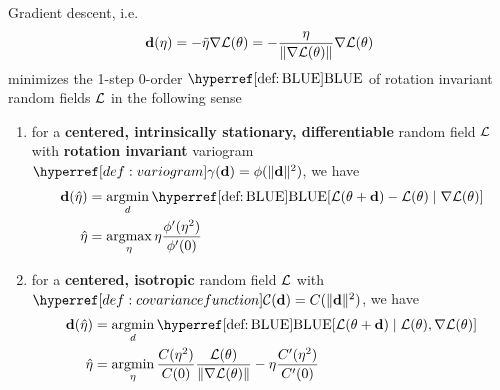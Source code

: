 
\begin{theorem}\label{thm: bayesian descent}
	Gradient descent, i.e. 
	\begin{equation*}
		\mathbf{d}(\eta) = - \tilde{\eta} \nabla\mathcal{L}(\theta)
		= - \frac{\eta}{\|\nabla\mathcal{L}(\theta)\|} \nabla\mathcal{L}(\theta)
	\end{equation*}
	minimizes the 1-step 0-order \(\BLUE\) of rotation invariant random fields
	\(\mathcal{L}\) in the following sense
	\begin{enumerate}
		\item for a \textbf{centered, intrinsically stationary, differentiable}
		random field \(\mathcal{L}\) with \textbf{rotation invariant} variogram
		\(\variogram(\step) = \phi(\|\step\|^2)\), we have
		\begin{align*}
			\step(\hat{\lr})
			&= \argmin_{d}
			\BLUE[\Loss(\param + \step) - \Loss(\param)\mid \grad\Loss(\param)]\\
			\hat{\lr}
			&= \argmax_{\lr} \lr\frac{\phi'(\lr^2)}{\phi'(0)}
		\end{align*}

		\item for a \textbf{centered, isotropic} random field \(\mathcal{L}\) with
		\(\C(\step)=C(\|\step\|^2)\), we have
		\begin{align*}
			\step(\hat{\lr})
			&= \argmin_{d}
			\BLUE[\Loss(\param + \step)\mid \Loss(\param), \grad\Loss(\param)]\\
			\hat{\lr}
			&= \argmin_{\lr}\frac{\sqC(\lr^2)}{\sqC(0)} \frac{\Loss(\param)}{\|\grad\Loss(\param)\|}
			-  \lr\frac{\sqC'(\lr^2)}{\sqC'(0)}
		\end{align*}
	\end{enumerate}
\end{theorem}
